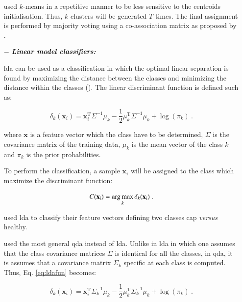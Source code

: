 \begin{enumerate}[leftmargin=*]
\cite{Tiwari2008,Viswanath2008,Viswanath2008a} used $k$-means in a repetitive manner to be less sensitive to the centroids initialisation. Thus, $k$ clusters will be generated $T$ times. The final assignment is performed by majority voting using a co-association matrix as proposed by \cite{Fred2005}.

\item[$-$] \textbf{\textit{Linear model classifiers:}} 

\Acf{lda} can be used as a classification in which the optimal linear separation is found by maximizing the distance between the classes and minimizing the distance within the classes (\cite{Friedman1989}). The linear discriminant function is defined such as:

\begin{equation}
	\delta_{k}(\mathbf{x}_i) = \mathbf{x}_i^{\text{T}} \Sigma^{-1} \mu_k - \frac{1}{2} \mu_{k}^{\text{T}} \Sigma^{-1} \mu_k + \log (\pi_k) \ .
	\label{eq:ldafun}
\end{equation}

\noindent where $\mathbf{x}$ is a feature vector which the class have to be determined, $\Sigma$ is the covariance matrix of the training data, $\mu_k$ is the mean vector of the class $k$ and $\pi_k$ is the prior probabilities.

To perform the classification, a sample $\mathbf{x}_i$ will be assigned to the class which maximize the discriminant function:

\begin{equation}
	C(\mathbf{x}_i) = \operatorname*{arg\,max}_k \delta_k(\mathbf{x}_i) \ .
	\label{eq:ldaclass}
\end{equation}

\cite{Antic2013,Chan2003,Niaf2011,Niaf2012,Vos2012} used \ac{lda} to classify their feature vectors defining two classes \ac{cap} \textit{versus} healthy.

\cite{Viswanath2012} used the most general \acf{qda} instead of \ac{lda}. Unlike in \ac{lda} in which one assumes that the class covariance matrices $\Sigma$ is identical for all the classes, in \ac{qda}, it is assumes that a covariance matrix $\Sigma_k$ specific at each class is computed. Thus, Eq. \ref{eq:ldafun} becomes:

\begin{equation}
	\delta_{k}(\mathbf{x}_i) = \mathbf{x}_i^{\text{T}} \Sigma_{k}^{-1} \mu_k - \frac{1}{2} \mu_{k}^{\text{T}} \Sigma_{k}^{-1} \mu_k + \log (\pi_k) \ .
	\label{eq:qdafun}
\end{equation}


\end{enumerate}
